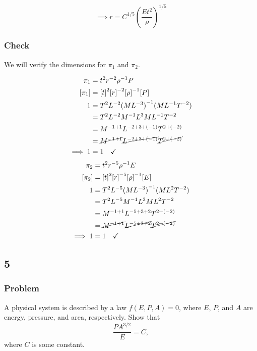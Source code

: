 \documentclass[12pt,twoside]{article}
\begin{document}
  \begin{equation*}
    \boxed{\implies r = C^{1/5}{\left(\frac{Et^2}{\rho}\right)}^{1/5}}
  \end{equation*}

  \subsubsection*{Check}
  We will verify the dimensions for $\pi_1$ and $\pi_2$.

  \begin{equation*}
    \begin{aligned}
      \pi_1 &= t^2r^{-2}\rho^{-1}P \\
      [\pi_1] &= {[t]}^2{[r]}^{-2}{[\rho]}^{-1}[P] \\
      1 &= T^2L^{-2}{(ML^{-3})}^{-1}(ML^{-1}T^{-2}) \\
      &= T^2L^{-2}M^{-1}L^{3}ML^{-1}T^{-2} \\
      &= M^{-1+1}L^{-2+3+(-1)}T^{2+(-2)} \\
      &= \cancel{M^{-1+1}}\cancel{L^{-2+3+(-1)}}\cancel{T^{2+(-2)}} \\
      \implies 1 &= 1 \quad\checkmark \\
    \end{aligned}
  \end{equation*}
  \begin{equation*}
    \begin{aligned}
      \pi_2 &= t^{2} r^{-5} \rho^{-1} E  \\
      [\pi_2] &= {[t]}^{2} {[r]}^{-5} {[\rho]}^{-1} [E] \\
      1 &= T^2 L^{-5} {(ML^{-3})}^{-1} (ML^2T^{-2}) \\
      &= T^2 L^{-5} M^{-1}L^{3} ML^2T^{-2} \\
      &= M^{-1+1} L^{-5+3+2} T^{2+(-2)} \\
      &= \cancel{M^{-1+1}} \cancel{L^{-5+3+2}} \cancel{T^{2+(-2)}} \\
      \implies 1 &= 1 \quad\checkmark \\
    \end{aligned}
  \end{equation*}

\subsection{5}
  \subsubsection*{Problem}
  A physical system is described by a law $f(E,P,A)=0$, where $E$, $P$, and $A$
  are energy, pressure, and area, respectively. Show that
  \begin{equation}
    \label{eq:5-problem}
    \frac{PA^{3/2}}{E} = C,
  \end{equation}
  where $C$ is some constant.
\end{document}
